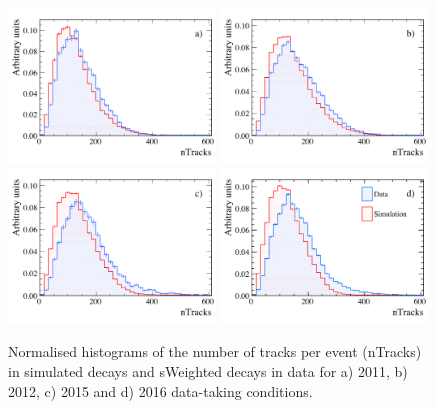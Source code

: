 \begin{figure}[tbp]
  \centering
    \includegraphics[width=0.49\textwidth]{./Figs/LifetimeMeasurement/Bd2KPi_2011_data_MC_nTracks.pdf}
    \includegraphics[width=0.49\textwidth]{./Figs/LifetimeMeasurement/Bd2KPi_2012_data_MC_nTracks.pdf}
    \includegraphics[width=0.49\textwidth]{./Figs/LifetimeMeasurement/Bd2KPi_2015_data_MC_nTracks.pdf}
    \includegraphics[width=0.49\textwidth]{./Figs/LifetimeMeasurement/Bd2KPi_2016_data_MC_nTracks.pdf}
  \caption{Normalised histograms of the number of tracks per event (nTracks) in simulated \bdkpi decays and sWeighted \bdkpi decays in data for a) 2011, b) 2012, c) 2015 and d) 2016 data-taking conditions.}  \label{fig:nTracksMCDataComp}
\end{figure}


